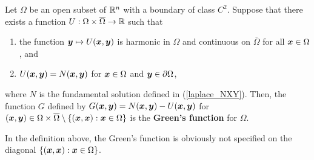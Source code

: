 \begin{defn} \label{DefnGreenFunct}
Let $\Omega$ be an open subset of $\mathbb{R}^n$ with a boundary of class
$\displaystyle C^2$.  Suppose that there exists a function
$U: \Omega \times \overline{\Omega} \to \mathbb{R}$ such that
\begin{enumerate}
\item the function ${\bm{y}} \mapsto U({\bm{x}},{\bm{y}})$
is harmonic in $\Omega$ and continuous on $\overline{\Omega}$ for all
${\bm{x}} \in \Omega$, and
\item $U({\bm{x}},{\bm{y}}) = N({\bm{x}},{\bm{y}})$ for ${\bm{x}}\in \Omega$ and
${\bm{y}} \in \partial \Omega$,
\end{enumerate}
where $N$ is the fundamental solution defined in (\ref{laplace_NXY}).
Then, the function $G$ defined by
$G({\bm{x}},{\bm{y}}) = N({\bm{x}},{\bm{y}}) - U({\bm{x}},{\bm{y}})$
for $({\bm{x}},{\bm{y}}) \in \Omega \times \overline{\Omega}
\setminus \{ ({\bm{x}},{\bm{x}}) : {\bm{x}} \in \Omega \}$
is the {\bfseries Green's function} for $\Omega$.
\end{defn}

In the definition above, the Green's function is obviously not
specified on the diagonal $\{ ({\bm{x}},{\bm{x}}) : {\bm{x}} \in \Omega\}$.

